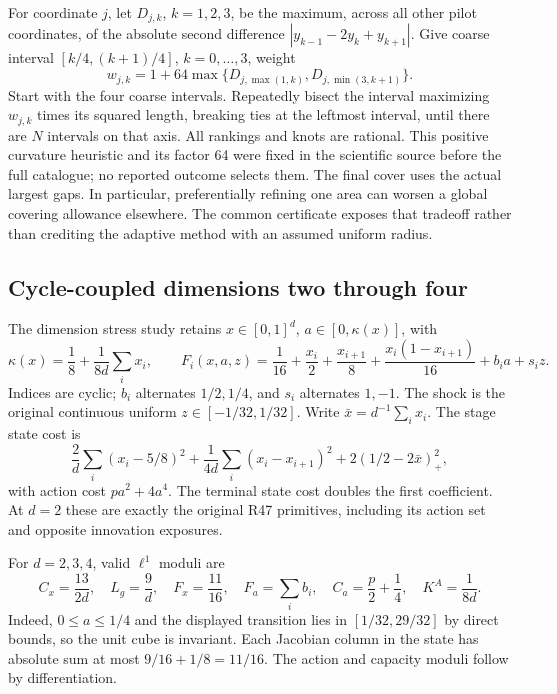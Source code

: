 For coordinate $j$, let $D_{j,k}$, $k=1,2,3$, be the maximum, across all other pilot coordinates, of the absolute second difference $|y_{k-1}-2y_k+y_{k+1}|$. Give coarse interval $[k/4,(k+1)/4]$, $k=0,\ldots,3$, weight
\[
 w_{j,k}=1+64\max\{D_{j,\max(1,k)},D_{j,\min(3,k+1)}\}.
\]
Start with the four coarse intervals. Repeatedly bisect the interval maximizing $w_{j,k}$ times its squared length, breaking ties at the leftmost interval, until there are $N$ intervals on that axis. All rankings and knots are rational. This positive curvature heuristic and its factor 64 were fixed in the scientific source before the full catalogue; no reported outcome selects them. The final cover uses the actual largest gaps. In particular, preferentially refining one area can worsen a global covering allowance elsewhere. The common certificate exposes that tradeoff rather than crediting the adaptive method with an assumed uniform radius.

\subsection{Cycle-coupled dimensions two through four}
The dimension stress study retains $x\in[0,1]^d$, $a\in[0,\kappa(x)]$, with
\[
 \kappa(x)=\frac18+\frac1{8d}\sum_i x_i,\qquad
 F_i(x,a,z)=\frac1{16}+\frac{x_i}2+\frac{x_{i+1}}8
 +\frac{x_i(1-x_{i+1})}{16}+b_i a+s_i z.
\]
Indices are cyclic; $b_i$ alternates $1/2,1/4$, and $s_i$ alternates $1,-1$. The shock is the original continuous uniform $z\in[-1/32,1/32]$. Write $\bar x=d^{-1}\sum_i x_i$. The stage state cost is
\[
 \frac2d\sum_i(x_i-5/8)^2+
 \frac1{4d}\sum_i(x_i-x_{i+1})^2+
 2(1/2-2\bar x)_+^2,
\]
with action cost $pa^2+4a^4$. The terminal state cost doubles the first coefficient. At $d=2$ these are exactly the original R47 primitives, including its action set and opposite innovation exposures.

For $d=2,3,4$, valid $\ell^1$ moduli are
\begin{equation}\label{eq:moduli48}
 C_x=\frac{13}{2d},\quad L_g=\frac9d,\quad
 F_x=\frac{11}{16},\quad F_a=\sum_i b_i,\quad
 C_a=\frac p2+\frac14,\quad K^A=\frac1{8d}.
\end{equation}
Indeed, $0\le a\le1/4$ and the displayed transition lies in $[1/32,29/32]$ by direct bounds, so the unit cube is invariant. Each Jacobian column in the state has absolute sum at most $9/16+1/8=11/16$. The action and capacity moduli follow by differentiation.

